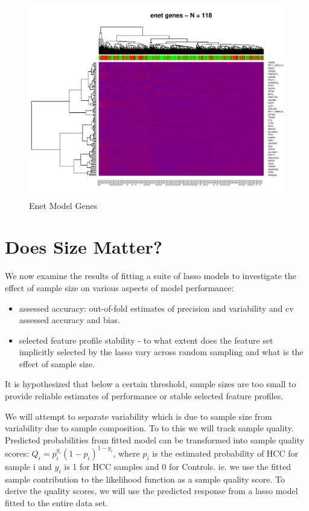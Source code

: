 \documentclass[
]{book}
\begin{document}
\begin{figure}
\centering
\includegraphics{Static/figures/heatmapEnet-1.pdf}
\caption{\label{fig:heatmapEnet}Enet Model Genes}
\end{figure}

\hypertarget{model-suite}{%
\chapter{Does Size Matter?}\label{model-suite}}

We now examine the results of fitting a suite of lasso models to
investigate the effect of sample size on
various aspects of model performance:

\begin{itemize}
\item
  assessed accuracy: out-of-fold estimates of precision and variability and
  cv assessed accuracy and bias.
\item
  selected feature profile stability - to what extent does the
  feature set implicitly selected by the lasso vary across random
  sampling and what is the effect of sample size.
\end{itemize}

It is hypothesized that below a certain threshold,
sample sizes are too small to provide reliable estimates
of performance or stable selected feature profiles.

We will attempt to separate variability which is due to
sample size from variability due to sample composition.
To to this we will track sample quality.
Predicted probabilities from fitted model can be transformed into sample
quality scores: \(Q_i = p_i^{y_i}(1-p_i)^{1-y_i}\), where \(p_i\) is the
estimated probability of HCC for sample i and \(y_i\) is 1 for HCC samples and
0 for Controls. ie. we use the fitted sample contribution to the
likelihood function as a sample quality score. To derive the quality scores,
we will use the predicted response from a lasso model fitted to the entire data set.
\end{document}
